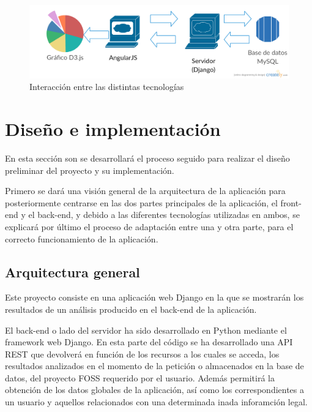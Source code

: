 \documentclass[a4paper, spanish, 12pt]{book}
\begin{document}
\begin{figure}[H]
    \centering
    \includegraphics[width=12cm, keepaspectratio]{img/technologies-interaction}
    \caption{Interacci\'on entre las distintas tecnolog\'ias}
    \label{fig:interaction}
\end{figure}



\cleardoublepage
\chapter{Dise\~no e implementaci\'on}

En esta secci\'on son se desarrollar\'a el proceso seguido para realizar el dise\~no
preliminar del proyecto y su implementaci\'on.

Primero se dar\'a una visi\'on general de la arquitectura de la aplicaci\'on para
posteriormente centrarse en las dos partes principales de la aplicaci\'on, el front-end
y el back-end, y debido a las diferentes tecnolog\'ias utilizadas en ambos, se
explicar\'a por \'ultimo el proceso de adaptaci\'on entre una y otra parte, para
el correcto funcionamiento de la aplicaci\'on.

\section{Arquitectura general}
\label{sec:arquitectura}

Este proyecto consiste en una aplicaci\'on web Django en la que se mostrar\'an los resultados
de un an\'alisis producido en el back-end de la aplicaci\'on.

El back-end o lado del servidor ha sido desarrollado en Python mediante el framework
web Django. En esta parte del c\'odigo se ha desarrollado una API REST que devolver\'a
en funci\'on de los recursos a los cuales se acceda, los resultados analizados en el
momento de la petici\'on o almacenados en la base de datos, del proyecto FOSS requerido
por el usuario. Adem\'as permitir\'a la obtenci\'on de los datos globales de la aplicaci\'on,
as\'i como los correspondientes a un usuario y aquellos relacionados con una determinada
inada
inforamci\'on legal.
\end{document}
